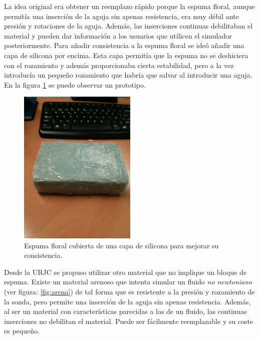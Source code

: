 La idea original era obtener un reemplazo rápido porque la espuma floral, aunque permitía una inserción de la aguja sin apenas resistencia, era muy débil ante presión y rotaciones de la aguja. Además, las inserciones continuas debilitaban el material y pueden dar información a los usuarios que utilicen el simulador posteriormente.
Para añadir consistencia a la espuma floral se ideó añadir una capa de silicona por encima. Esta capa permitía que la espuma no se deshiciera con el rozamiento y además proporcionaba cierta estabilidad, pero a la vez introducía un pequeño rozamiento que habría que salvar al introducir una aguja. En la figura \ref{fig:silicona} se puede observar un prototipo.

\begin{figure}[h]
    \centering
    \includegraphics[width=0.5\textwidth]{IMG/silicona.jpg}
    \caption{Espuma floral cubierta de una capa de silicona para mejorar su consistencia.}
    \label{fig:silicona}
\end{figure}

Desde la \ac{URJC} se propuso utilizar otro material que no implique un bloque de espuma. Existe un material arenoso que intenta simular un fluido \emph{no newtoniano} (ver figura: \ref{fig:arena}) de tal forma que es resistente a la presión y rozamiento de la sonda, pero permite una inserción de la aguja sin apenas resistencia. Además, al ser un material con características parecidas a las de un fluido, las continuas inserciones no debilitan el material. Puede ser fácilmente reemplazable y su coste es pequeño.


